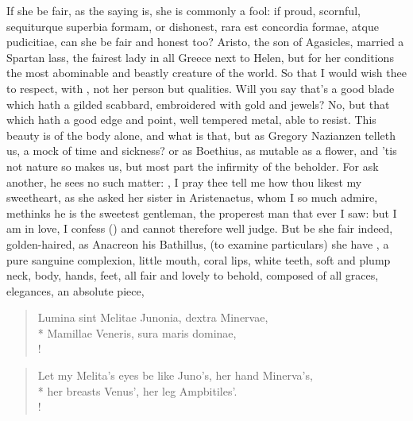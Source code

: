 If she be fair, as the saying is, she is commonly a fool: if proud,
scornful, sequiturque superbia formam, or dishonest, rara est concordia
formae, atque pudicitiae, can she be fair and honest too? 
Aristo, the son of Agasicles, married a Spartan lass, the fairest lady
in all Greece next to Helen, but for her conditions the most abominable
and beastly creature of the world. So that I would wish thee to
respect, with \Seneca{}, not her person but qualities. Will you say
that's a good blade which hath a gilded scabbard, embroidered with gold
and jewels? No, but that which hath a good edge and point, well
tempered metal, able to resist. This beauty is of the body alone, and
what is that, but as  Gregory Nazianzen telleth us, a mock of
time and sickness? or as Boethius, as mutable as a flower, and
'tis not nature so makes us, but most part the infirmity of the
beholder. For ask another, he sees no such matter: , I pray thee tell me how thou likest my sweetheart,
as she asked her sister in Aristenaetus, whom I so much admire,
methinks he is the sweetest gentleman, the properest man that ever I
saw: but I am in love, I confess () and cannot
therefore well judge. But be she fair indeed, golden-haired, as
Anacreon his Bathillus, (to examine particulars) she have , a
pure sanguine complexion, little mouth, coral lips, white teeth, soft and plump
neck, body, hands, feet, all fair and lovely to behold, composed of all graces,
elegances, an absolute piece,
%
\begin{latin}
\begin{verse}%
Lumina sint Melitae Junonia, dextra Minervae,\\*
Mamillae Veneris, sura maris dominae,\\!
\end{verse}%
\end{latin}
\translationrule%
\begin{verse}%
Let my Melita's eyes be like Juno's, her hand Minerva's,\\*
her breasts Venus', her leg Ampbitiles'.\\!
\end{verse}%
%


